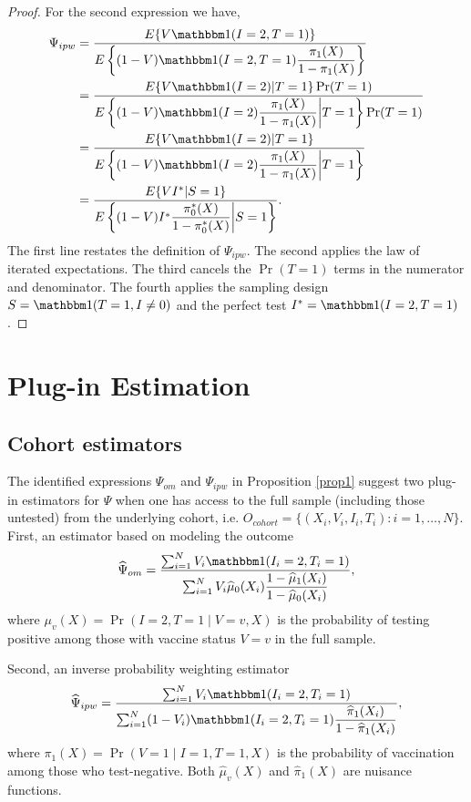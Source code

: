 \begin{appendix}
\begin{proof}
    For the second expression we have,
    \begin{align*}
        \Psi_{ipw} &= \dfrac{E\{V \mathbbm 1 (I = 2, T = 1)\}}{E\left\{ (1 - V) \mathbbm 1(I = 2, T = 1) \dfrac{\pi_1(X)}{1 - \pi_1(X)}\right\}} \\
        &= \dfrac{E\{V \mathbbm 1 (I = 2) | T = 1\} \Pr(T = 1)}{E\left\{ (1 - V) \mathbbm 1(I = 2) \dfrac{\pi_1(X)}{1 - \pi_1(X)} \bigg| T = 1\right\} \Pr(T = 1)} \\
        &= \dfrac{E\{V \mathbbm 1 (I = 2) | T = 1\}}{E\left\{ (1 - V) \mathbbm 1(I = 2) \dfrac{\pi_1(X)}{1 - \pi_1(X)} \bigg| T = 1\right\}} \\
        &= \dfrac{E\{VI^*|S =1\}}{E\left\{ (1 - V) I^* \dfrac{\pi^*_0(X)}{1 - \pi^*_0(X)} \bigg| S = 1\right\}}.
    \end{align*}
    The first line restates the definition of $\Psi_{ipw}$. The second applies the law of iterated expectations. The third cancels the $\Pr(T = 1)$ terms in the numerator and denominator. The fourth applies the sampling design $S = \mathbbm 1 (T = 1, I \neq 0)$ and the perfect test $I^* = \mathbbm 1(I = 2, T=1)$.
    \end{proof}
    
    \newpage
    \section{Plug-in Estimation}\label{sec:app_estimation}
    \subsection{Cohort estimators}
    The identified expressions $\Psi_{om}$ and $\Psi_{ipw}$ in Proposition \ref{prop1} suggest two plug-in estimators for $\Psi$ when one has access to the full sample (including those untested) from the underlying cohort, i.e. $O_{cohort} = \{(X_i, V_i, I_i, T_i) : i = 1, \ldots, N\}$. First, an estimator based on modeling the outcome
    \begin{equation}\label{eqn:om_estimator_cohort}
        \widehat{\Psi}_{om} = \dfrac{\sum_{i=1}^N V_i \mathbbm 1 (I_i=2, T_i=1)}{\sum_{i=1}^N V_i \widehat{\mu}_0(X_i)\dfrac{1 - \widehat{\mu}_1(X_i)}{1 - \widehat{\mu}_0(X_i)}},
    \end{equation}
    where $\mu_v(X) = \Pr(I=2, T=1 \mid V=v, X)$ is the probability of testing positive among those with vaccine status $V = v$ in the full sample. 
    
    Second, an inverse probability weighting estimator
    \begin{equation}\label{eqn:ipw_estimator_cohort}
        \widehat{\Psi}_{ipw} = \dfrac{\sum_{i=1}^N V_i \mathbbm 1 (I_i=2, T_i=1)}{\sum_{i=1}^N (1 - V_i) \mathbbm 1 (I_i=2, T_i=1) \dfrac{\widehat{\pi}_1(X_i)}{1 - \widehat{\pi}_1(X_i)}},
    \end{equation}
    where $\pi_1(X) = \Pr(V=1\mid I=1, T=1, X)$ is the  probability of vaccination among those who test-negative. Both $\widehat{\mu}_v(X)$ and $\widehat{\pi}_1(X)$ are nuisance functions. 


\end{appendix}
